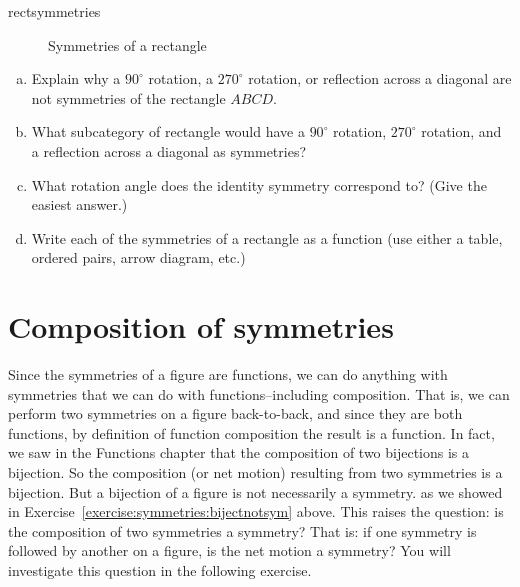 \begin{example}{rectsymmetries}
\begin{figure}[htb]
\begin{center}
\caption{\label{SymmOfRect}Symmetries of a rectangle}
\end{center}
\end{figure}
\end{example}

\begin{exercise}{10}
\begin{enumerate}[(a)]
\item
Explain why a $90^\circ$ rotation, a $270^\circ$ rotation, or reflection across a diagonal are not symmetries  of the rectangle $ABCD$.
\item
What subcategory of rectangle would have a $90^\circ$ rotation, $270^\circ$ rotation, and a reflection across a diagonal as symmetries?
\item
What rotation angle does the identity symmetry correspond to? (Give the easiest answer.)
\item
Write each of the symmetries of a rectangle as a function (use either a table, ordered pairs, arrow diagram, etc.)
\end{enumerate}
\end{exercise}  


\section{Composition of symmetries}

Since the symmetries of a figure are functions, we can do anything with symmetries that we can do with functions--including composition.  That is,  we can perform two symmetries on a figure back-to-back, and since they are both functions, by definition of function composition the result is a function.  In fact, we saw in the Functions chapter that the composition of two bijections is a bijection.  So the composition (or net motion) resulting from two symmetries is a bijection.  But a bijection of a figure is not necessarily a symmetry. as we showed in Exercise~\ref{exercise:symmetries:bijectnotsym} above.  This raises the question:  is the composition of two symmetries a symmetry?  That is: if one symmetry is followed by another on a figure, is the net motion a symmetry?  You will investigate this question in the following exercise.

